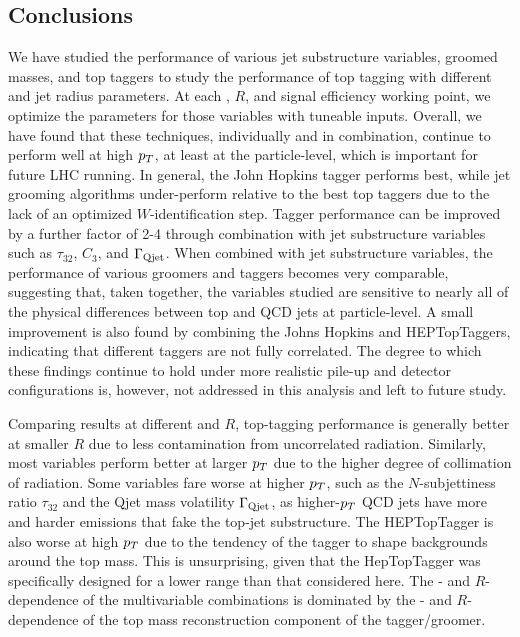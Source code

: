 \subsection{Conclusions}


We have studied the performance of various jet substructure variables, groomed masses, and top taggers to study the performance of top tagging with different \pt and jet radius parameters. At each \pt, $R$, and signal efficiency working point, we optimize the parameters for those variables with tuneable inputs. Overall, we have found that these techniques, individually and in combination, continue to perform well at high $p_T$, at least at the particle-level, which is important for future LHC running. In general, the John Hopkins tagger performs best, while jet grooming algorithms under-perform relative to the best top taggers due to the lack of an optimized $W$-identification step. 
Tagger performance can be improved by a further factor of 2-4 through combination with jet substructure variables such as $\tau_{32}$, $C_3$, and $\Gamma_{\rm Qjet}$. When combined with jet substructure variables, the performance of various groomers and taggers becomes very comparable, suggesting that, taken together, the variables studied are sensitive to nearly all of the physical differences between top and QCD jets at particle-level. A small improvement is also found by combining the Johns Hopkins and HEPTopTaggers, indicating that different taggers are not fully correlated. The degree to which these findings continue to hold under more realistic pile-up and detector configurations is, however, not addressed in this analysis and left to future study.

Comparing results at different \pt and $R$, top-tagging performance is generally better at smaller $R$ due to less contamination from uncorrelated radiation. Similarly, most variables perform better at larger $p_T$ due to the higher degree of collimation of radiation. Some variables fare worse at higher $p_T$, such as the $N$-subjettiness ratio $\tau_{32}$ and the Qjet mass volatility $\Gamma_{\rm Qjet}$, as higher-$p_T$ QCD jets have more and harder emissions that fake the top-jet substructure. The HEPTopTagger is also worse at high $p_T$ due to the tendency of the tagger to shape backgrounds around the top mass. This is unsurprising, given that the HepTopTagger was specifically designed for a lower \pT range than that considered here. The \pt- and $R$-dependence of the multivariable combinations is dominated by the \pt- and $R$-dependence of the top mass reconstruction component of the tagger/groomer.

